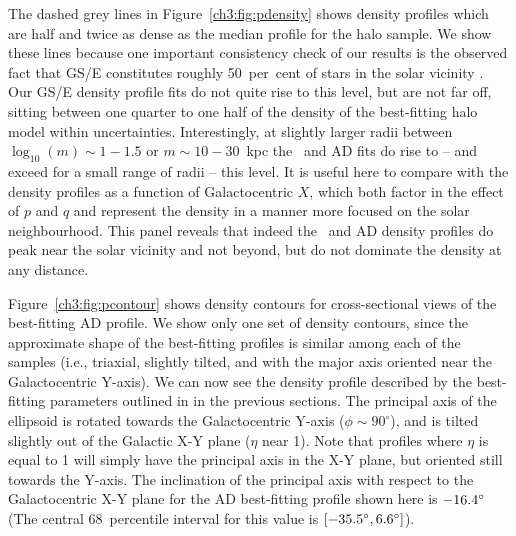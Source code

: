 The dashed grey lines in Figure~\ref{ch3:fig:pdensity} shows density profiles which are half and twice as dense as the median profile for the halo sample. We show these lines because one important consistency check of our results is the observed fact that GS/E constitutes roughly 50~per~cent of stars in the solar vicinity \parencite{belokurov18,lancaster19,fattahi19}. Our GS/E density profile fits do not quite rise to this level, but are not far off, sitting between one quarter to one half of the density of the best-fitting halo model within uncertainties. Interestingly, at slightly larger radii between $\log_{10}(m) \sim 1-1.5 $ or $ m \sim 10-30$~kpc the \eLz\ and AD fits do rise to -- and exceed for a small range of radii -- this level. It is useful here to compare with the density profiles as a function of Galactocentric $X$, which both factor in the effect of $p$ and $q$ and represent the density in a manner more focused on the solar neighbourhood. This panel reveals that indeed the \eLz\ and AD density profiles do peak near the solar vicinity and not beyond, but do not dominate the density at any distance.

Figure~\ref{ch3:fig:pcontour} shows density contours for cross-sectional views of the best-fitting AD profile. We show only one set of density contours, since the approximate shape of the best-fitting profiles is similar among each of the samples (i.e., triaxial, slightly tilted, and with the major axis oriented near the Galactocentric Y-axis). We can now see the density profile described by the best-fitting parameters outlined in in the previous sections. The principal axis of the ellipsoid is rotated towards the Galactocentric Y-axis ($\phi \sim 90^{\circ}$), and is tilted slightly out of the Galactic X-Y plane ($\eta$ near 1). Note that profiles where $\eta$ is equal to 1 will simply have the principal axis in the X-Y plane, but oriented still towards the Y-axis. The inclination of the principal axis with respect to the Galactocentric X-Y plane for the AD best-fitting profile shown here is $-16.4\hbox{$^\circ$}$ (The central 68~percentile interval for this value is $[-35.5\hbox{$^\circ$},6.6\hbox{$^\circ$}]$).

